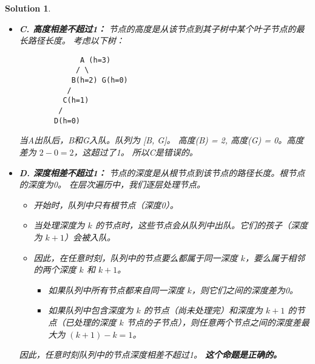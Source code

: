 \documentclass[UTF8]{report}
\newtheorem{solution}{Solution}
\theoremstyle{MyLineTheoremStyle} %
\theoremstyle{MyBlockTheoremStyle} %
\theoremstyle{MySubsubsectionStyle} %
\begin{document}
\begin{solution}
\begin{itemize}
    \item \textbf{C. 高度相差不超过1：}
        节点的高度是从该节点到其子树中某个叶子节点的最长路径长度。
        考虑以下树：
        \begin{verbatim}
              A (h=3)
             / \
            B(h=2) G(h=0)
           /
          C(h=1)
         /
        D(h=0)
        \end{verbatim}
        当A出队后，B和G入队。队列为 [B, G]。
        高度(B) = 2, 高度(G) = 0。高度差为 $2 - 0 = 2$，这超过了1。
        所以C是错误的。

    \item \textbf{D. 深度相差不超过1：}
        节点的深度是从根节点到该节点的路径长度。根节点的深度为0。
        在层次遍历中，我们逐层处理节点。
        \begin{itemize}
            \item 开始时，队列中只有根节点（深度0）。
            \item 当处理深度为 $k$ 的节点时，这些节点会从队列中出队。它们的孩子（深度为 $k+1$）会被入队。
            \item 因此，在任意时刻，队列中的节点要么都属于同一深度 $k$，要么属于相邻的两个深度 $k$ 和 $k+1$。
                \begin{itemize}
                    \item 如果队列中所有节点都来自同一深度 $k$，则它们之间的深度差为0。
                    \item 如果队列中包含深度为 $k$ 的节点（尚未处理完）和深度为 $k+1$ 的节点（已处理的深度 $k$ 节点的子节点），则任意两个节点之间的深度差最大为 $(k+1) - k = 1$。
                \end{itemize}
        \end{itemize}
        因此，任意时刻队列中的节点深度相差不超过1。
        \textbf{这个命题是正确的。}
\end{itemize}
\end{solution}
\end{document}
